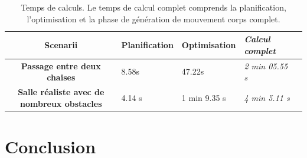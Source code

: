 \begin{table}
  \begin{center}
    \begin{tabular}{|c|l l l|l|}
      \hline \bf Scenarii & Planification & Optimisation &
      \emph{Calcul complet}\\ \hline \bf Passage entre deux chaises &
      8.58s & 47.22s & \emph{2 min 05.55 s}\\ \hline \bf Salle
      réaliste avec de nombreux obstacles & 4.14 s & 1 min 9.35 s &
      \emph{4 min 5.11 s}\\ \hline
    \end{tabular}
  \end{center}
  \caption{Temps de calculs. Le temps de calcul complet comprends la
    planification, l'optimisation et la phase de génération de
    mouvement corps complet.\label{tab:benchmarks}}
\end{table}


\section{Conclusion}
\label{sec:chap1_conclusion}

